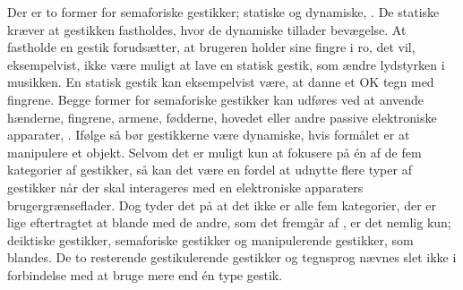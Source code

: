 Der er to former for semaforiske gestikker; statiske og dynamiske, \parencite[s. 7]{PDF:ATaxonomyOfGestures}. De statiske kræver at gestikken fastholdes, hvor de dynamiske tillader bevægelse. At fastholde en gestik forudsætter, at brugeren holder sine fingre i ro, det vil, eksempelvist, ikke være muligt at lave en statisk gestik, som ændre lydstyrken i musikken. En statisk gestik kan eksempelvist være, at danne et OK tegn med fingrene. Begge former for semaforiske gestikker kan udføres ved at anvende hænderne, fingrene, armene, fødderne, hovedet eller andre passive elektroniske apparater, \parencite[s. 7]{PDF:ATaxonomyOfGestures}. Ifølge \textcite[s. 823]{PDF:UnderstandingNaturalness} så bør gestikkerne være dynamiske, hvis formålet er at manipulere et objekt. \blankline
%
Selvom det er muligt kun at fokusere på én af de fem kategorier af gestikker, så kan det være en fordel at udnytte flere typer af gestikker når der skal interageres med en elektroniske apparaters brugergrænseflader. Dog tyder det på at det ikke er alle fem kategorier, der er lige eftertragtet at blande med de andre, som det fremgår af \textcite[s. 8]{PDF:ATaxonomyOfGestures}, er det nemlig kun; deiktiske gestikker, semaforiske gestikker og manipulerende gestikker, som blandes. De to resterende gestikulerende gestikker og tegnsprog nævnes slet ikke i forbindelse med at bruge mere end én type gestik. 
%
